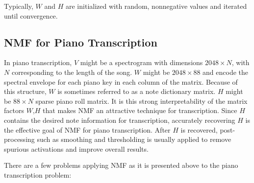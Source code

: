 \documentclass[5p]{elsarticle}
\begin{document}
\noindent Typically, $W$ and $H$ are initialized with random, nonnegative values and iterated until convergence.

\subsection{NMF for Piano Transcription}
In piano transcription, $V$ might be a spectrogram with dimensions $2048 \times N$, with $N$ corresponding to the length of the song. $W$ might be $2048 \times 88$ and encode the spectral envelope for each piano key in each column of the matrix. Because of this structure, $W$ is sometimes referred to as a note dictionary matrix. $H$ might be $88 \times N$ sparse piano roll matrix. It is this strong interpretability of the matrix factors $W$,$H$ that makes NMF an attractive technique for transcription.  Since $H$ contains the desired note information for transcription, accurately recovering $H$ is the effective goal of NMF for piano transcription. After $H$ is recovered, post-processing such as smoothing and thresholding is usually applied to remove spurious activations and improve overall results.


There are a few problems applying NMF as it is presented above to the piano transcription problem:
\end{document}

